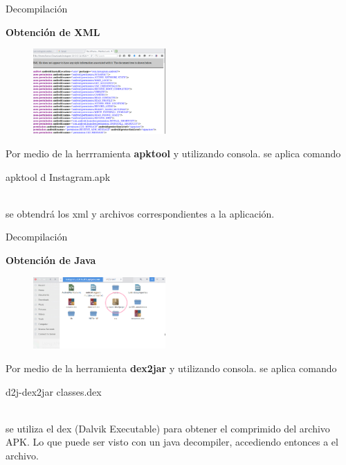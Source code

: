 \begin{frame}[t,fragile]{Decompilación}

\textbf{Obtención de XML}

\begin{figure} 
\vspace{2pt}
  \begin{center}
    \includegraphics[width=0.45\textwidth]{xml.png}
    \label{fig:databaseUserTable}
  \end{center}
  \vspace{2pt}
\end{figure} 

\bigskip

 Por medio de la herrramienta \textbf{apktool} y utilizando consola. se aplica comando
\begin{center}
    apktool d Instagram.apk
\end{center}
 \\
 
 se obtendrá los xml y archivos correspondientes a la aplicación.

\end{frame}

\begin{frame}[t,fragile]{Decompilación}

\textbf{Obtención de Java}

\begin{figure} 
\vspace{2pt}
  \begin{center}
    \includegraphics[width=0.45\textwidth]{jarclases.png}
    \label{fig:databaseUserTable}
  \end{center}
  \vspace{2pt}
\end{figure} 

\bigskip

 Por medio de la herramienta \textbf{dex2jar} y utilizando consola. se aplica comando
\begin{center}
    d2j-dex2jar classes.dex
\end{center}
 \\
 
 se utiliza el dex (Dalvik Executable) para obtener el comprimido del archivo APK. Lo que puede ser visto con un java decompiler, accediendo entonces a el archivo.

\end{frame}


